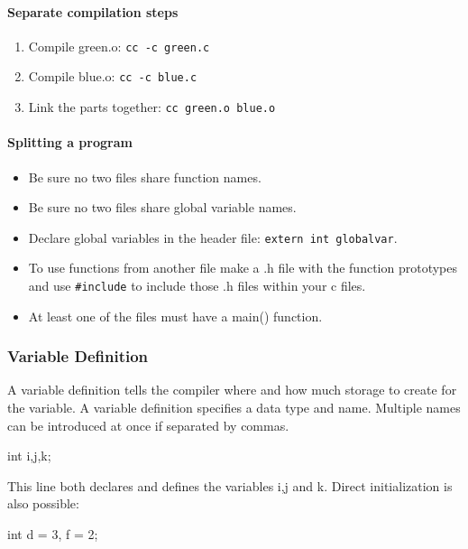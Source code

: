 \documentclass[10pt,a4paper]{scrartcl}
\begin{document}
\begin{multicols*}{2}
\paragraph{Separate compilation steps}

\begin{enumerate}
\item Compile green.o: \verb+cc -c green.c+
\item Compile blue.o: \verb+cc -c blue.c+
\item Link the parts together: \verb+cc green.o blue.o+
\end{enumerate}

\paragraph{Splitting a program}

\begin{itemize}
\item Be sure no two files share function names.
\item Be sure no two files share global variable names.
\item Declare global variables in the header file: \verb+extern int globalvar+.
\item To use functions from another file make a .h file with the function prototypes and use \verb+#include+ to include those .h files within your c files.
\item At least one of the files must have a main() function.
\end{itemize}

\subsubsection{Variable Definition}
\label{sec:VariableDefinition}

A variable definition tells the compiler where and how much storage to create for the variable. A variable definition specifies a data type and name. Multiple names can be introduced at once if separated by commas.

\begin{TPCpp}
int i,j,k;
\end{TPCpp}

This line both declares and defines the variables i,j and k.
Direct initialization is also possible:

\begin{TPCpp}
int d = 3, f = 2;
\end{TPCpp}


\end{multicols*}
\end{document}
